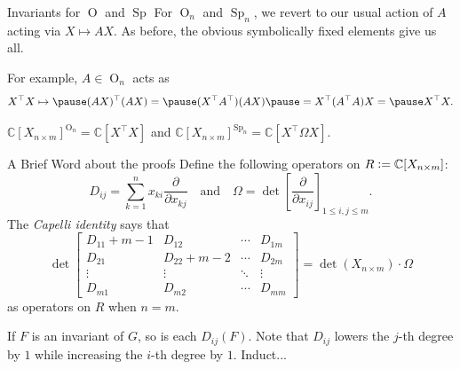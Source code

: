\documentclass{beamer}
\DeclareMathOperator{\Sp}{Sp}
\DeclareMathOperator{\OO}{O}
\begin{document}
	\begin{frame}{Invariants for \texorpdfstring{$\OO$}{O} and \texorpdfstring{$\Sp$}{Sp}}
		For $\OO_{n}$ and $\Sp_{n}$, we revert to our usual action of $A$ acting via $X \mapsto AX$. \pause As before, the obvious symbolically fixed elements give us all. \pause

		For example, $A \in \OO_{n}$ acts as
		\begin{equation*} 
			X^{\top} X \mapsto \pause (AX)^{\top} (AX) = \pause (X^{\top} A^{\top}) (A X) \pause = X^{\top} (A^{\top} A) X = \pause X^{\top} X.
		\end{equation*}
		\pause 

		\begin{theorem}
			$\mathbb{C}[X_{n \times m}]^{\OO_{n}} = \mathbb{C}[X^{\top} X]$ and $\mathbb{C}[X_{n \times m}]^{\Sp_{n}} = \mathbb{C}[X^{\top} \Omega X]$.
		\end{theorem}
	\end{frame}

	\begin{frame}{A Brief Word about the proofs}
		Define the following operators on $R \vcentcolon= \mathbb{C}[X_{n \times m}]$:
		\begin{equation*} 
			D_{ij} = \sum_{k = 1}^{n} x_{ki} \dfrac{\partial}{\partial x_{kj}} \quad\text{and}\quad \Omega = \det \left[\dfrac{\partial}{\partial x_{ij}}\right]_{1 \le i, j \le m}.
		\end{equation*}
		\pause 
		The \emph{Capelli identity} says that
		\begin{equation*} 
			\det 
			\begin{bmatrix}
				D_{11} + m - 1 & D_{12} & \cdots & D_{1m} \\
				D_{21} & D_{22} + m - 2 & \cdots & D_{2m} \\
				\vdots & \vdots & \ddots & \vdots \\
				D_{m1} & D_{m2} & \cdots & D_{mm}
			\end{bmatrix}
			= \det(X_{n \times m}) \cdot \Omega
		\end{equation*}
		as operators on $R$ when $n = m$. \pause

		If $F$ is an invariant of $G$, so is each $D_{ij}(F)$. Note that $D_{ij}$ lowers the $j$-th degree by $1$ while increasing the $i$-th degree by $1$. Induct...
	\end{frame}
\end{document}
